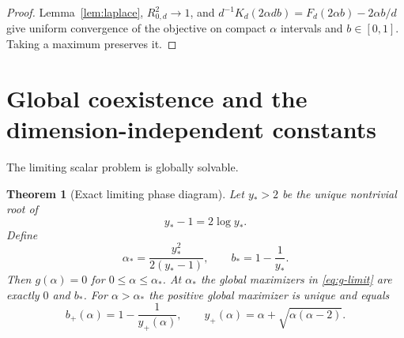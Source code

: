 \documentclass[11pt,a4paper]{article}
\newtheorem{theorem}{Theorem}[section]
\theoremstyle{remark}
\begin{document}
\begin{proof}
Lemma~\ref{lem:laplace}, $R_{0,d}^2\to1$, and
$d^{-1}K_d(2\alpha db)=F_d(2\alpha b)-2\alpha b/d$ give uniform convergence
of the objective on compact $\alpha$ intervals and $b\in[0,1]$.  Taking a
maximum preserves it.
\end{proof}

\section{Global coexistence and the dimension-independent constants}

The limiting scalar problem is globally solvable.

\begin{theorem}[Exact limiting phase diagram]
\label{thm:phase}
Let $y_*>2$ be the unique nontrivial root of
\begin{equation}
 y_*-1=2\log y_*.
 \label{eq:ystar}
\end{equation}
Define
\begin{equation}
 \alpha_*=\frac{y_*^2}{2(y_*-1)},
 \qquad b_*=1-\frac1{y_*}.
 \label{eq:constants}
\end{equation}
Then $g(\alpha)=0$ for $0\le\alpha\le\alpha_*$.  At $\alpha_*$ the global
maximizers in \eqref{eq:g-limit} are exactly $0$ and $b_*$.  For
$\alpha>\alpha_*$ the positive global maximizer is unique and equals
\begin{equation}
 b_+(\alpha)=1-\frac1{y_+(\alpha)},
 \qquad
 y_+(\alpha)=\alpha+\sqrt{\alpha(\alpha-2)}.
 \label{eq:positive-branch}
\end{equation}
\end{theorem}
\end{document}
